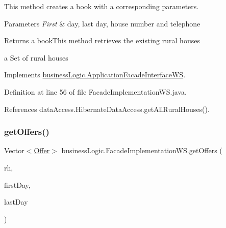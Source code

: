 This method creates a book with a corresponding parameters. 


\begin{DoxyParams}{Parameters}
{\em First} & day, last day, house number and telephone \\
\hline
\end{DoxyParams}
\begin{DoxyReturn}{Returns}
a book\+This method retrieves the existing rural houses

a Set of rural houses 
\end{DoxyReturn}


Implements \mbox{\hyperlink{interfacebusinessLogic_1_1ApplicationFacadeInterfaceWS_a553cbfb37ea9f1621ba76ad8308a15da}{business\+Logic.\+Application\+Facade\+Interface\+WS}}.



Definition at line 56 of file Facade\+Implementation\+W\+S.\+java.


\begin{DoxyCode}{0}

\end{DoxyCode}


References data\+Access.\+Hibernate\+Data\+Access.\+get\+All\+Rural\+Houses().

\mbox{\label{classbusinessLogic_1_1FacadeImplementationWS_a7489fb15fdb8206b16daf6ed24fdfea0}} 
\subsubsection{\texorpdfstring{getOffers()}{getOffers()}}
{\footnotesize\ttfamily Vector$<$\mbox{\hyperlink{classdomain_1_1Offer}{Offer}}$>$ business\+Logic.\+Facade\+Implementation\+W\+S.\+get\+Offers (\begin{DoxyParamCaption}\item[{\mbox{\hyperlink{classdomain_1_1RuralHouse}{Rural\+House}}}]{rh,  }\item[{Date}]{first\+Day,  }\item[{Date}]{last\+Day }\end{DoxyParamCaption})}




